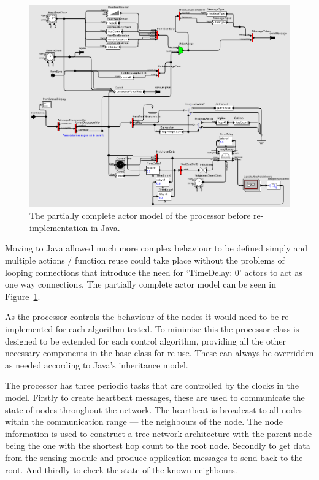 \documentclass[authoryearcitations]{UoYCSproject}
\begin{document}
\begin{figure}
 \centering
    \includegraphics[width=\textwidth]{figures/processorInternals.png}
    \caption{The partially complete actor model of the processor before re-implementation in Java.}
    \label{fig:processorInternals}
\end{figure}

Moving to Java allowed much more complex behaviour to be defined simply and multiple actions / function reuse could take place without the problems of looping connections that introduce the need for `TimeDelay: 0' actors to act as one way connections. The partially complete actor model can be seen in Figure~\ref{fig:processorInternals}.

As the processor controls the behaviour of the nodes it would need to be re-implemented for each algorithm tested. To minimise this the processor class is designed to be extended for each control algorithm, providing all the other necessary components in the base class for re-use. These can always be overridden as needed according to Java's inheritance model.

The processor has three periodic tasks that are controlled by the clocks in the model. Firstly to create heartbeat messages, these are used to communicate the state of nodes throughout the network. The heartbeat is broadcast to all nodes within the communication range --- the neighbours of the node. The node information is used to construct a tree network architecture with the parent node being the one with the shortest hop count to the root node. Secondly to get data from the sensing module and produce application messages to send back to the root. And thirdly to check the state of the known neighbours.
\end{document}
